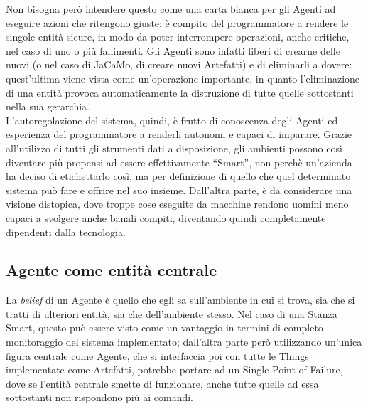 \documentclass[12pt,a4paper,openright,oneside]{report}
\newcommand{\quotes}[1]{``#1''}
\begin{document}
Non bisogna però intendere questo come una carta bianca per gli Agenti ad eseguire azioni che ritengono giuste: è compito del programmatore a rendere le singole entità sicure, in modo da poter interrompere operazioni, anche critiche, nel caso di uno o più fallimenti. Gli Agenti sono infatti liberi di crearne delle nuovi (o nel caso di JaCaMo, di creare nuovi Artefatti) e di eliminarli a dovere: quest'ultima viene vista come un'operazione importante, in quanto l'eliminazione di una entità provoca automaticamente la distruzione di tutte quelle sottostanti nella sua gerarchia.\\

L'autoregolazione del sistema, quindi, è frutto di conoscenza degli Agenti ed esperienza del programmatore a renderli autonomi e capaci di imparare. Grazie all'utilizzo di tutti gli strumenti dati a disposizione, gli ambienti possono così diventare più propensi ad essere effettivamente \quotes{Smart}, non perchè un'azienda ha deciso di etichettarlo così, ma per definizione di quello che quel determinato sistema può fare e offrire nel suo insieme. Dall'altra parte, è da considerare una visione distopica, dove troppe cose eseguite da macchine rendono uomini meno capaci a svolgere anche banali compiti, diventando quindi completamente dipendenti dalla tecnologia.

\subsection{Agente come entità centrale}
La \textit{belief} di un Agente è quello che egli sa sull'ambiente in cui si trova, sia che si tratti di ulteriori entità, sia che dell'ambiente stesso. Nel caso di una Stanza Smart, questo può essere visto come un vantaggio in termini di completo monitoraggio del sistema implementato; dall'altra parte però utilizzando un'unica figura centrale come Agente, che si interfaccia poi con tutte le Things implementate come Artefatti, potrebbe portare ad un Single Point of Failure, dove se l'entità centrale smette di funzionare, anche tutte quelle ad essa sottostanti non rispondono più ai comandi.\\
\end{document}

